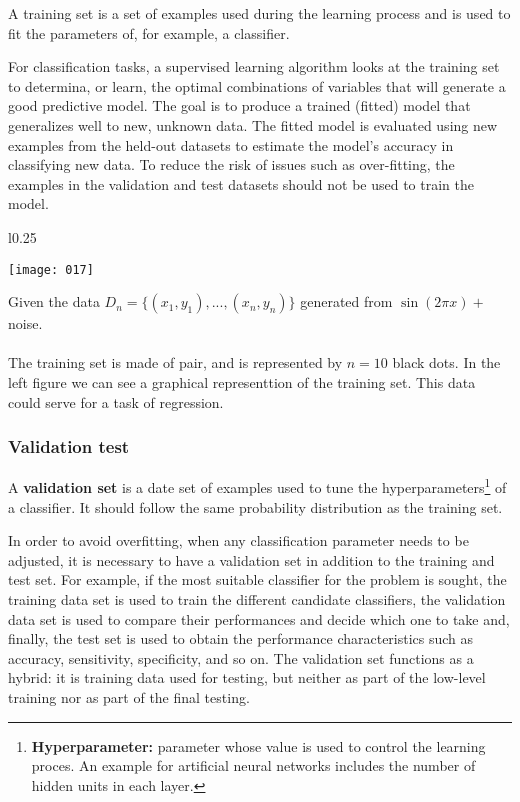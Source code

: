 A training set is a set of examples used during the learning process and is used to fit the parameters of, for example, a classifier.

For classification tasks, a supervised learning algorithm looks at the training set to determina, or learn, the optimal combinations of variables that will generate a good predictive model. The goal is to produce a trained (fitted) model that generalizes well to new, unknown data. The fitted model is evaluated using new examples from the held-out datasets to estimate the model's accuracy in classifying new data. To reduce the risk of issues such as over-fitting, the examples in the validation and test datasets should not be used to train the model.

\begin{example}
\begin{wrapfigure}{l}{0.25\textwidth}
\begin{center}
    \texttt{[image: 017]}
    \label{fig:017}
\end{center}
\end{wrapfigure}
Given the data \(D_n=\{(x_1,y_1),...,(x_n,y_n)\}\) generated from \(\sin(2 \pi x) + \)noise.\\
\\
The training set is made of pair, and is represented by \(n=10\) black dots. In the left figure we can see a graphical representtion of the training set. This data could serve for a task of regression.

\end{example}

\subsubsection{Validation test}
A \textbf{validation set} is a date set of examples used to tune the hyperparameters\footnote{\textbf{Hyperparameter:}  parameter whose value is used to control the learning proces. An example for artificial neural networks includes the number of hidden units in each layer.} of a classifier. It should follow the same probability distribution as the training set.

In order to avoid overfitting, when any classification parameter needs to be adjusted, it is necessary to have a validation set in addition to the training and test set. For example, if the most suitable classifier for the problem is sought, the training data set is used to train the different candidate classifiers, the validation data set is used to compare their performances and decide which one to take and, finally, the test set is used to obtain the performance characteristics such as accuracy, sensitivity, specificity, and so on. The validation set functions as a hybrid: it is training data used for testing, but neither as part of the low-level training nor as part of the final testing.

